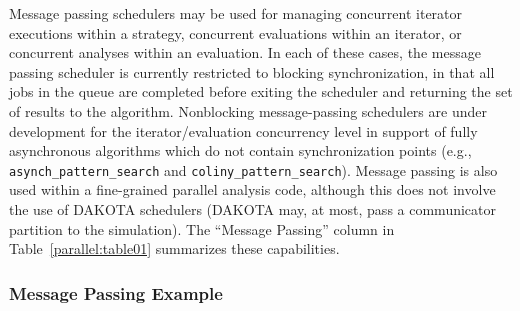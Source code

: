 
Message passing schedulers may be used for managing concurrent
iterator executions within a strategy, concurrent evaluations within
an iterator, or concurrent analyses within an evaluation.  In each of
these cases, the message passing scheduler is currently restricted to
blocking synchronization, in that all jobs in the queue are completed
before exiting the scheduler and returning the set of results to the
algorithm. Nonblocking message-passing schedulers are under
development for the iterator/evaluation concurrency level in support
of fully asynchronous algorithms which do not contain synchronization
points (e.g., \texttt{asynch\_pattern\_search} and
\texttt{coliny\_pattern\_search}).  Message passing is also used within
a fine-grained parallel analysis code, although this does not involve
the use of DAKOTA schedulers (DAKOTA may, at most, pass a communicator
partition to the simulation).  The ``Message Passing'' column in
Table~\ref{parallel:table01} summarizes these capabilities.

\subsubsection{Message Passing Example}\label{parallel:SLP:message:ex}


